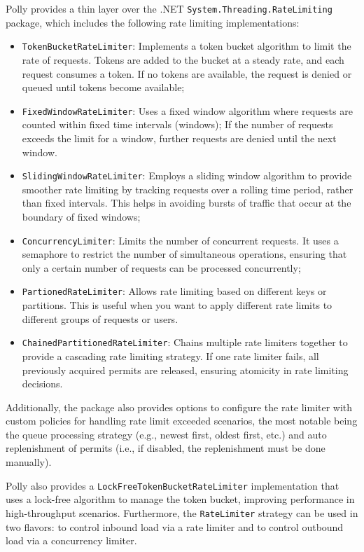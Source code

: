 Polly provides a thin layer over the .NET \texttt{System.Threading.RateLimiting}~\cite{microsoft-rate-limiting-dotnet} package,
which includes the following rate limiting implementations:
\begin{itemize}
    \item \texttt{TokenBucketRateLimiter}: Implements a token bucket algorithm to limit the rate of requests. Tokens are added to the bucket at a steady rate, and each request consumes a token. If no tokens are available, the request is denied or queued until tokens become available;
    \item \texttt{FixedWindowRateLimiter}: Uses a fixed window algorithm where requests are counted within fixed time intervals (windows);
    If the number of requests exceeds the limit for a window, further requests are denied until the next window.
    \item \texttt{SlidingWindowRateLimiter}: Employs a sliding window algorithm to provide smoother rate limiting by tracking requests over a rolling time period, rather than fixed intervals. This helps in avoiding bursts of traffic that occur at the boundary of fixed windows;
    \item \texttt{ConcurrencyLimiter}: Limits the number of concurrent requests. It uses a semaphore to restrict the number of simultaneous operations, ensuring that only a certain number of requests can be processed concurrently;
    \item \texttt{PartionedRateLimiter}: Allows rate limiting based on different keys or partitions.
    This is useful when you want to apply different rate limits to different groups of requests or users.
    \item \texttt{ChainedPartitionedRateLimiter}:
    Chains multiple rate limiters together to provide a cascading rate limiting strategy.
    If one rate limiter fails, all previously acquired permits are released, ensuring atomicity in rate limiting decisions.
\end{itemize}

Additionally,
the package also provides options
to configure the rate limiter with custom policies for handling rate limit exceeded scenarios,
the most notable being the queue processing strategy
(e.g., newest first, oldest first, etc.) and auto replenishment of permits (i.e., if disabled, the replenishment must be done manually).

Polly also provides a \texttt{LockFreeTokenBucketRateLimiter} implementation
that uses a lock-free algorithm to manage the token bucket,
improving performance in high-throughput scenarios.
Furthermore, the \texttt{RateLimiter} strategy can be used in two flavors: to control inbound load via a rate limiter and to control outbound load via a concurrency limiter.



